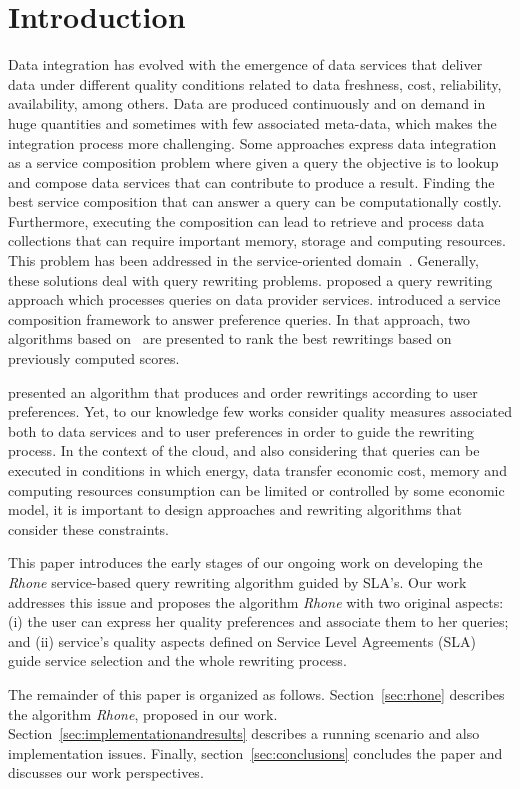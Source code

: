 \section{Introduction}
Data integration
has evolved with the emergence of data   services that deliver data under different quality conditions  related to data freshness, cost, reliability, availability, among others. Data are produced continuously and on demand in huge quantities and sometimes with few associated meta-data, which makes the integration process more challenging. Some approaches express data integration as a service composition problem where given a query the objective is to lookup and compose data services that can contribute to produce a result. Finding the best service composition that can answer a query can be computationally costly. Furthermore,  executing the composition can lead to retrieve and process data collections that can require important memory, storage and computing resources.
This problem has  been addressed in the service-oriented domain~\cite{Barhamgi2010,Benouaret2011,ba2014}.
Generally, these solutions deal with query rewriting problems.
\cite{Barhamgi2010} proposed a query rewriting approach which processes queries on data provider services. \cite{Benouaret2011} introduced a service composition framework to answer preference queries. In that approach, two algorithms based on~\cite{Barhamgi2010} are presented to rank the best rewritings based on previously computed scores.

\cite{ba2014} presented an algorithm that produces and order rewritings according to user preferences. Yet, to our knowledge few works consider quality measures associated both to data services and to user preferences in order to guide the rewriting process. In the context of the cloud, and also considering that queries can be executed in conditions in which energy, data transfer economic cost, memory and computing resources consumption can be limited or controlled by some economic model, it is important to design approaches and rewriting algorithms that consider these constraints.


This paper introduces the early stages of our
ongoing work on developing the \textit{Rhone} service-based query rewriting
algorithm guided by SLA's. Our work addresses this issue and proposes the  algorithm \textit{Rhone} with  two original aspects: (i) the user can express her
quality preferences and associate them to her queries; and (ii)  service's quality
aspects defined on Service Level Agreements (SLA) guide  service selection and  the whole rewriting process.    

The remainder of this paper is organized as follows. Section~\ref{sec:rhone}
describes the  algorithm \textit{Rhone}, proposed in our work. Section~\ref{sec:implementationandresults} describes
a running scenario and also  implementation issues.
Finally, section~\ref{sec:conclusions} concludes the paper and discusses our work perspectives.
